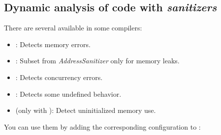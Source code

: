 \subsection{Dynamic analysis of code with \emph{sanitizers}}

There are several  
available in some compilers:

\begin{itemize}
  \item {}: 
        Detects memory errors.
  \item {}: 
        Subset from \emph{AddressSanitizer} 
        only for memory leaks.
  \item {}: 
        Detects concurrency errors.
  \item {}: 
        Detects some undefined behavior.
  \item {} (only with ): 
        Detect uninitialized memory use.
\end{itemize}

You can use them by adding the corresponding configuration to
:

